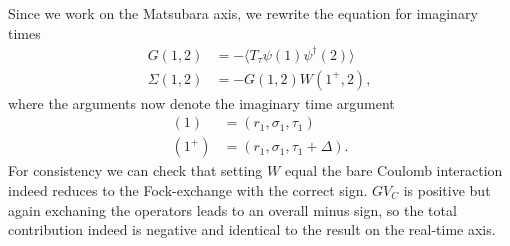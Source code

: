 \documentclass[12pt,a4paper]{scrartcl}
\numberwithin{equation}{section}
\begin{document}
Since we work on the Matsubara axis, we rewrite 
the equation for imaginary times
\begin{align}
G(1,2) &= - \langle T_{\tau} \psi(1)\psi^{\dagger}(2) \rangle \\
\Sigma(1,2) &= - G(1,2)W(1^+,2),
\end{align}
where the arguments now denote the imaginary time argument
\begin{align}
 (1) &= (r_1,\sigma_1,\tau_1) \\
 (1^+) &= (r_1,\sigma_1,\tau_1+\Delta).
\end{align}
For consistency we can check that setting $W$ equal
the bare Coulomb interaction indeed reduces to the
Fock-exchange with the correct sign. $GV_C$ is positive
but again exchaning the operators leads to an overall minus sign,
so the total contribution indeed is negative and identical
to the result on the real-time axis.
\end{document}

